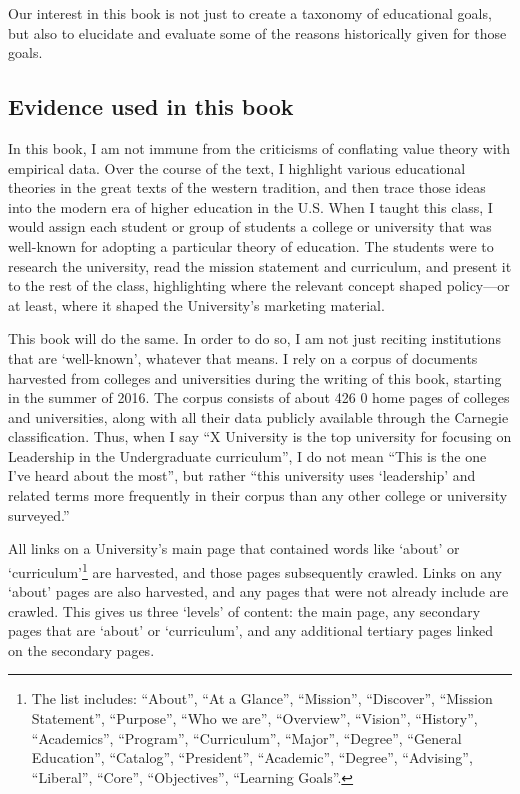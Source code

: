 Our interest in this book is not just to create a taxonomy of educational goals, but also to elucidate and evaluate some of the reasons historically given for those goals.

\subsection{Evidence used in this book}
\label{evidenceusedinthisbook}

In this book, I am not immune from the criticisms of conflating value theory with empirical data. Over the course of the text, I highlight various educational theories in the great texts of the western tradition, and then trace those ideas into the modern era of higher education in the U.S. When I taught this class, I would assign each student or group of students a college or university that was well-known for adopting a particular theory of education. The students were to research the university, read the mission statement and curriculum, and present it to the rest of the class, highlighting where the relevant concept shaped policy---or at least, where it shaped the University's marketing material.

This book will do the same. In order to do so, I am not just reciting institutions that are `well-known', whatever that means. I rely on a corpus of documents harvested from colleges and universities during the writing of this book, starting in the summer of 2016. The corpus consists of about 426 0 home pages of colleges and universities, along with all their data publicly available through the Carnegie classification. Thus, when I say ``X University is the top university for focusing on Leadership in the Undergraduate curriculum'', I do not mean ``This is the one I've heard about the most'', but rather ``this university uses `leadership' and related terms more frequently in their corpus than any other college or university surveyed.''

All links on a University's main page that contained words like `about' or `curriculum'\footnote{The list includes: ``About'', ``At a Glance'', ``Mission'', ``Discover'', ``Mission Statement'', ``Purpose'', ``Who we are'', ``Overview'', ``Vision'', ``History'', ``Academics'', ``Program'', ``Curriculum'', ``Major'', ``Degree'', ``General Education'', ``Catalog'', ``President'', ``Academic'', ``Degree'', ``Advising'', ``Liberal'', ``Core'', ``Objectives'', ``Learning Goals''.} are harvested, and those pages subsequently crawled. Links on any `about' pages are also harvested, and any pages that were not already include are crawled. This gives us three `levels' of content: the main page, any secondary pages that are `about' or `curriculum', and any additional tertiary pages linked on the secondary pages.

